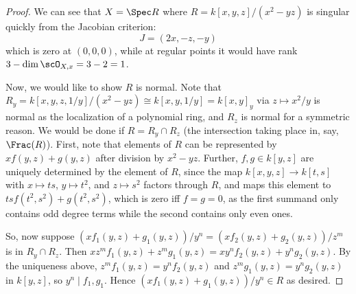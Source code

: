 \begin{proof}
	We can see that $X = \Spec R$ where $R = k[x,y,z]/(x^2-yz)$ is singular quickly from the Jacobian criterion:
	\[ J = (2x, -z, -y) \]
	which is zero at $(0,0,0)$, while at regular points it would have rank $3-\dim\scO_{X,x} = 3-2 = 1$.
	
	Now, we would like to show $R$ is normal. Note that $R_y = k[x,y,z,1/y]/(x^2-yz) \cong k[x,y,1/y] = k[x,y]_y$ via $z \mapsto x^2/y$ is normal as the localization of a polynomial ring, and $R_z$ is normal for a symmetric reason. We would be done if $R = R_y \cap R_z$ (the intersection taking place in, say, $\Frac(R)$). First, note that elements of $R$ can be represented by $xf(y,z)+g(y,z)$ after division by $x^2-yz$. Further, $f,g \in k[y,z]$ are uniquely determined by the element of $R$, since the map $k[x,y,z] \to k[t,s]$ with $x \mapsto ts$, $y \mapsto t^2$, and $z \mapsto s^2$ factors through $R$, and maps this element to $tsf(t^2,s^2)+g(t^2,s^2)$, which is zero iff $f = g = 0$, as the first summand only contains odd degree terms while the second contains only even ones.
	
	So, now suppose $(xf_1(y,z)+g_1(y,z))/y^n = (xf_2(y,z)+g_2(y,z))/z^m$ is in $R_y \cap R_z$. Then $xz^mf_1(y,z)+z^mg_1(y,z) = xy^nf_2(y,z)+y^ng_2(y,z)$. By the uniqueness above, $z^mf_1(y,z) = y^nf_2(y,z)$ and $z^mg_1(y,z) = y^ng_2(y,z)$ in $k[y,z]$, so $y^n \mid f_1,g_1$. Hence $(xf_1(y,z)+g_1(y,z))/y^n \in R$ as desired.
\end{proof}
